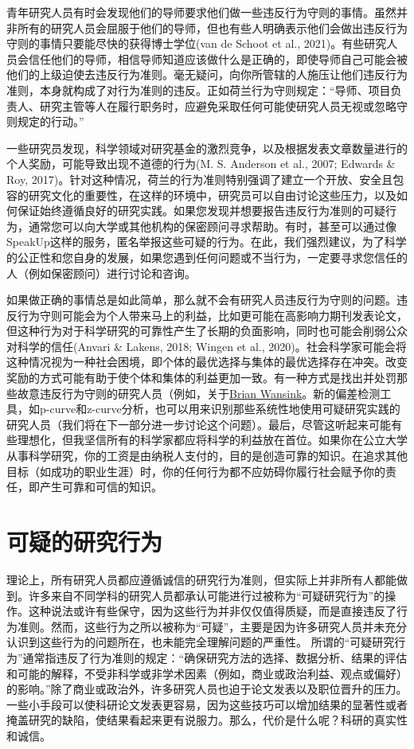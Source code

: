 \documentclass[
  letterpaper,
  DIV=11,
  numbers=noendperiod]{scrreprt}
\begin{document}
青年研究人员有时会发现他们的导师要求他们做一些违反行为守则的事情。虽然并非所有的研究人员会屈服于他们的导师，但也有些人明确表示他们会做出违反行为守则的事情只要能尽快的获得博士学位(van
de Schoot et al.,
2021)。有些研究人员会信任他们的导师，相信导师知道应该做什么是正确的，即使导师自己可能会被他们的上级迫使去违反行为准则。毫无疑问，向你所管辖的人施压让他们违反行为准则，本身就构成了对行为准则的违反。正如荷兰行为守则规定：``导师、项目负责人、研究主管等人在履行职务时，应避免采取任何可能使研究人员无视或忽略守则规定的行动。''

一些研究员发现，科学领域对研究基金的激烈竞争，以及根据发表文章数量进行的个人奖励，可能导致出现不道德的行为(M.
S. Anderson et al., 2007; Edwards \& Roy,
2017)。针对这种情况，荷兰的行为准则特别强调了建立一个开放、安全且包容的研究文化的重要性，在这样的环境中，研究员可以自由讨论这些压力，以及如何保证始终遵循良好的研究实践。如果您发现并想要报告违反行为准则的可疑行为，通常您可以向大学或其他机构的保密顾问寻求帮助。有时，甚至可以通过像SpeakUp这样的服务，匿名举报这些可疑的行为。在此，我们强烈建议，为了科学的公正性和您自身的发展，如果您遇到任何问题或不当行为，一定要寻求您信任的人（例如保密顾问）进行讨论和咨询。

如果做正确的事情总是如此简单，那么就不会有研究人员违反行为守则的问题。违反行为守则可能会为个人带来马上的利益，比如更可能在高影响力期刊发表论文，但这种行为对于科学研究的可靠性产生了长期的负面影响，同时也可能会削弱公众对科学的信任(Anvari
\& Lakens, 2018; Wingen et al.,
2020)。社会科学家可能会将这种情况视为一种社会困境，即个体的最优选择与集体的最优选择存在冲突。改变奖励的方式可能有助于使个体和集体的利益更加一致。有一种方式是找出并处罚那些故意违反行为守则的研究人员（例如，关于\href{https://www.vox.com/science-and-health/2018/9/19/17879102/brian-wansink-cornell-food-brand-lab-retractions-jama}{Brian
Wansink}。新的偏差检测工具，如p-curve和z-curve分析，也可以用来识别那些系统性地使用可疑研究实践的研究人员（我们将在下一部分进一步讨论这个问题）。最后，尽管这听起来可能有些理想化，但我坚信所有的科学家都应将科学的利益放在首位。如果你在公立大学从事科学研究，你的工资是由纳税人支付的，目的是创造可靠的知识。在追求其他目标（如成功的职业生涯）时，你的任何行为都不应妨碍你履行社会赋予你的责任，即产生可靠和可信的知识。

\hypertarget{sec-QRP}{%
\section{可疑的研究行为}\label{sec-QRP}}

理论上，所有研究人员都应遵循诚信的研究行为准则，但实际上并非所有人都能做到。许多来自不同学科的研究人员都承认可能进行过被称为``可疑研究行为''的操作。这种说法或许有些保守，因为这些行为并非仅仅值得质疑，而是直接违反了行为准则。然而，这些行为之所以被称为``可疑''，主要是因为许多研究人员并未充分认识到这些行为的问题所在，也未能完全理解问题的严重性。
所谓的``可疑研究行为''通常指违反了行为准则的规定：``确保研究方法的选择、数据分析、结果的评估和可能的解释，不受非科学或非学术因素（例如，商业或政治利益、观点或偏好）的影响。''除了商业或政治外，许多研究人员也迫于论文发表以及职位晋升的压力。一些小手段可以使科研论文发表更容易，因为这些技巧可以增加结果的显著性或者掩盖研究的缺陷，使结果看起来更有说服力。那么，代价是什么呢？科研的真实性和诚信。
\end{document}
